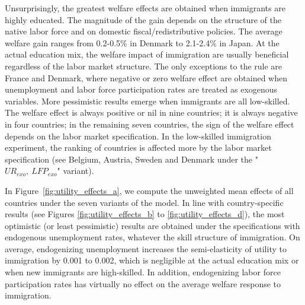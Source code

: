 \documentclass[a4paper,12pt]{article}
\begin{document}
Unsurprisingly, the greatest welfare effects are obtained when immigrants are highly educated. The magnitude of the gain depends on the structure of the native labor force and on domestic fiscal/redistributive policies. The average welfare gain ranges from 0.2-0.5\% in Denmark to 2.1-2.4\% in Japan. At the actual education mix, the welfare impact of immigration are usually beneficial regardless of the labor market structure. The only exceptions to the rule are France and Denmark, where negative or zero welfare effect are obtained when unemployment and labor force participation rates are treated as exogenous variables. More pessimistic results emerge when immigrants are all low-skilled. The welfare effect is always positive or nil in nine countries; it is always negative in four countries; in the remaining seven countries, the sign of the welfare effect depends on the labor market specification. In the low-skilled immigration experiment, the ranking of countries is affected more by the labor market specification (see Belgium, Austria, Sweden and Denmark under the "$UR_{exo},~LFP_{exo}$" variant).

In Figure~\ref{fig:utility_effects_a}, we compute the unweighted mean effects of all countries under the seven variants of the model. In line with country-specific results (see Figures \ref{fig:utility_effects_b} to \ref{fig:utility_effects_d}), the most optimistic (or least pessimistic) results are obtained under the specifications with endogenous unemployment rates, whatever the skill structure of immigration. On average, endogenizing unemployment increases the semi-elasticity of utility to immigration by 0.001 to 0.002, which is negligible at the actual education mix or when new immigrants are high-skilled. In addition, endogenizing labor force participation rates has virtually no effect on the average welfare response to immigration.
\end{document}
